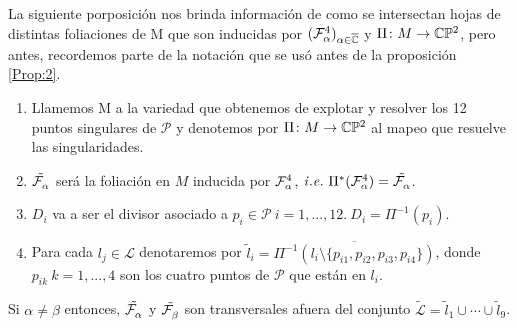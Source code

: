 
La siguiente porposición nos brinda información de como se intersectan hojas de distintas foliaciones de M que son inducidas por $(\Fol[4]{\alpha})_{\alpha\in\overline\C}$ y $\Pi\colon M\rightarrow\CP$, pero antes, recordemos parte de la notación que se usó antes de la proposición \ref{Prop:2}.

\begin{enumerate}


\item Llamemos M a la variedad que obtenemos de explotar y resolver los 12 puntos singulares de $\mathcal{P}$ y denotemos por $\Pi\colon M \rightarrow \CP$ al mapeo que resuelve las singularidades.

\item $\tilde{\Fol{\alpha}}$ será la foliación en $M$ inducida por $\Fol[4]{\alpha}$,  $\mathit{i.e.} \ \Pi^{*}(\Fol[4]{\alpha}) = \tilde{\Fol{\alpha}}$.

\item $D_{i}$ va a ser el divisor asociado a $p_{i} \in \mathcal{P} \ i=1,...,12. \ D_{i} = \Pi^{-1}(p_{i})$.

\item Para cada $l_{j} \in \mathcal{L}$ denotaremos por $\tilde{l}_{i} = \overline{\Pi^{-1}(l_{i} \setminus \{p_{i1}, p_{i2}, p_{i3}, p_{i4} \})}$, donde $p_{ik} \ k=1,...,4$ son los cuatro puntos de $\mathcal{P}$ que están en $l_{i}$.

\end{enumerate}


\begin{Proposicion}
\label{Prop:Transversalidad}
Si $\alpha\neq\beta$ entonces, $\tilde{\Fol{\alpha}}$ y $\tilde{\Fol{\beta}}$ son transversales afuera del conjunto $\tilde{\mathcal{L}} = \tilde{l}_{1}\cup\cdots\cup\tilde{l}_{9}$.
\end{Proposicion}

